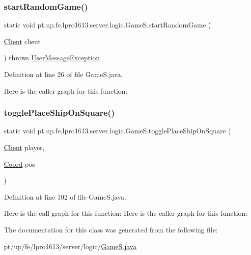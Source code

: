 \subsubsection{\texorpdfstring{start\+Random\+Game()}{startRandomGame()}}
{\footnotesize\ttfamily static void pt.\+up.\+fe.\+lpro1613.\+server.\+logic.\+Game\+S.\+start\+Random\+Game (\begin{DoxyParamCaption}\item[{\hyperlink{classpt_1_1up_1_1fe_1_1lpro1613_1_1server_1_1conn_1_1_client}{Client}}]{client }\end{DoxyParamCaption}) throws \hyperlink{classpt_1_1up_1_1fe_1_1lpro1613_1_1sharedlib_1_1exceptions_1_1_user_message_exception}{User\+Message\+Exception}\hspace{0.3cm}{\ttfamily [static]}}



Definition at line 26 of file Game\+S.\+java.

Here is the caller graph for this function\+:
\hypertarget{classpt_1_1up_1_1fe_1_1lpro1613_1_1server_1_1logic_1_1_game_s_a23c0059ae1482561f185d2fe06fa4582}{}\label{classpt_1_1up_1_1fe_1_1lpro1613_1_1server_1_1logic_1_1_game_s_a23c0059ae1482561f185d2fe06fa4582} 
\subsubsection{\texorpdfstring{toggle\+Place\+Ship\+On\+Square()}{togglePlaceShipOnSquare()}}
{\footnotesize\ttfamily static void pt.\+up.\+fe.\+lpro1613.\+server.\+logic.\+Game\+S.\+toggle\+Place\+Ship\+On\+Square (\begin{DoxyParamCaption}\item[{\hyperlink{classpt_1_1up_1_1fe_1_1lpro1613_1_1server_1_1conn_1_1_client}{Client}}]{player,  }\item[{\hyperlink{classpt_1_1up_1_1fe_1_1lpro1613_1_1sharedlib_1_1utils_1_1_coord}{Coord}}]{pos }\end{DoxyParamCaption})\hspace{0.3cm}{\ttfamily [static]}}



Definition at line 102 of file Game\+S.\+java.

Here is the call graph for this function\+:
Here is the caller graph for this function\+:


The documentation for this class was generated from the following file\+:\begin{DoxyCompactItemize}
\item 
pt/up/fe/lpro1613/server/logic/\hyperlink{_game_s_8java}{Game\+S.\+java}\end{DoxyCompactItemize}
